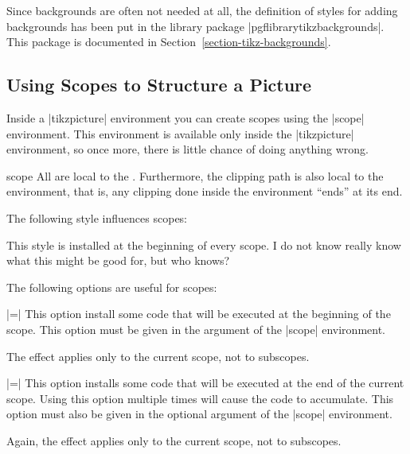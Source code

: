 Since backgrounds are often not needed at all, the definition of
styles for adding backgrounds has been put in the library package
|pgflibrarytikzbackgrounds|. This package is documented in
Section~\ref{section-tikz-backgrounds}. 


\subsection{Using Scopes to Structure a Picture}

Inside a |{tikzpicture}| environment you can create scopes
using the |{scope}| environment. This environment is available only
inside the |{tikzpicture}| environment, so once more, there is little
chance of doing anything wrong.

\begin{environment}{{scope}}
  All  are local to the . Furthermore, the clipping path is also local to the
  environment, that is, any clipping done inside the environment
  ``ends'' at its end.

\begin{codeexample}[]
\begin{tikzpicture}
  \begin{scope}[red]
    \draw (0mm,0mm) -- (10mm,0mm);
    \draw (0mm,1mm) -- (10mm,1mm);
  \end{scope}
  \draw (0mm,2mm) -- (10mm,2mm);
  \begin{scope}[green]
    \draw (0mm,3mm) -- (10mm,3mm);
    \draw (0mm,4mm) -- (10mm,4mm);
    \draw[blue] (0mm,5mm) -- (10mm,5mm);
  \end{scope}
\end{tikzpicture}
\end{codeexample}
  
  The following style influences scopes:
  \begin{itemize}
    This style is installed at the beginning of every scope. I do not
    know really know what this might be good for, but who knows?
  \end{itemize}

  The following options are useful for scopes:
  \begin{itemize}
    |=|
    This option install some code that will be executed
    at the beginning of the scope. This option must be
    given in the argument of the |{scope}| environment.

    The effect applies only to the current scope, not to subscopes.

    |=|
    This option installs some code that will be executed
    at the end of the  current scope. Using this option multiple times
    will  cause the code to accumulate. This option must also be given
    in the optional argument of the |{scope}| environment. 

    Again, the effect applies only to the current scope, not to subscopes.
  \end{itemize}
\end{environment}

